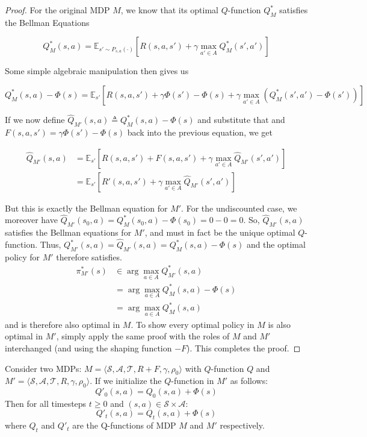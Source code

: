 \begin{proof}
For the original MDP \( M \), we know that its optimal \( Q \)-function \( Q^*_M \) satisfies the Bellman Equations

\[
Q^*_M(s,a) = \mathbb{E}_{s' \sim P_{s,a}(\cdot)} \left[ R(s,a,s') + \gamma \max_{a' \in A} Q^*_M(s',a') \right]
\]

Some simple algebraic manipulation then gives us

\[
Q^*_M(s,a) - \Phi(s) = \mathbb{E}_{s'} \left[ R(s,a,s') + \gamma \Phi(s') - \Phi(s) + \gamma \max_{a' \in A} \left( Q^*_M(s',a') - \Phi(s') \right) \right]
\]

If we now define \( \hat{Q}_{M'}(s,a) \triangleq Q^*_M(s,a) - \Phi(s) \) and substitute that and \( F(s,a,s') = \gamma \Phi(s') - \Phi(s) \) back into the previous equation, we get

\begin{align*}
\hat{Q}_{M'}(s,a)
&= \mathbb{E}_{s'} \left[ R(s,a,s') + F(s,a,s') + \gamma \max_{a' \in A} \hat{Q}_{M'}(s',a') \right] \\
&= \mathbb{E}_{s'} \left[ R'(s,a,s') + \gamma \max_{a' \in A} \hat{Q}_{M'}(s',a') \right]
\end{align*}

But this is exactly the Bellman equation for \( M' \). For the undiscounted case, we moreover have \( \hat{Q}_{M'}(s_0, a) = Q^*_M(s_0, a)- \Phi(s_0) = 0 - 0 = 0 \). So, \( \hat{Q}_{M'}(s,a) \) satisfies the Bellman equations for \( M' \), and must in fact be the unique optimal \( Q \)-function. Thus, \( Q^*_{M'}(s,a) = \hat{Q}_{M'}(s,a) = Q^*_M(s,a) - \Phi(s)\) and the optimal policy for \(M'\) therefore satisfies.
\begin{align*}
\pi^*_{M'}(s)
& \in \arg \max_{a \in A} Q^*_{M'}(s,a) \\
& = \arg \max_{a \in A} Q^*_{M}(s,a) - \Phi(s)\\
& = \arg \max_{a \in A} Q^*_M(s,a)
\end{align*}
and is therefore also optimal in \( M \). To show every optimal policy in \( M \) is also optimal in \( M' \), simply apply the same proof with the roles of \( M \) and \( M' \) interchanged (and using the shaping function \( -F \)). This completes the proof.
\end{proof}

\begin{theorem}\label{thm:convergence-efficiency-proof}
Consider two MDPs: \( M = \langle \mathcal{S}, \mathcal{A}, \mathcal{T}, R+F, \gamma, \rho_0 \rangle \) with $Q$-function $Q$ and \( M' = \langle \mathcal{S}, \mathcal{A}, \mathcal{T}, R, \gamma, \rho_0 \rangle \). If we initialize the $Q$-function in $M'$ as follows:
\begin{equation*}
    Q'_0(s, a) = Q_0(s, a) + \Phi(s)
\end{equation*}
Then for all timesteps $t \geq 0$ and $(s,a) \in \mathcal{S} \times \mathcal{A}$:
\begin{equation}
    Q'_t(s,a) = Q_t(s,a) + \Phi(s)
\end{equation}
where $Q_t$ and $Q'_t$ are the Q-functions of MDP $M$ and $M'$ respectively.
\end{theorem}

